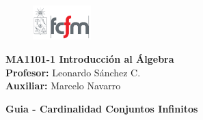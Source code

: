 \documentclass[letterpaper,12pt]{article}
\theoremstyle{plain}
\begin{document}
\newpage
\pagestyle{fancy}
\fancyhf{}
\fancyfoot[C]{\thepage} 

\begin{figure} %
    \vspace{-5mm}
    \includegraphics[width=0.2\textwidth]{img/fcfm2.png}
\end{figure}


\noindent
\textbf{MA1101-1 Introducción al Álgebra}\\
\textbf{Profesor: }Leonardo Sánchez C.\\
\textbf{Auxiliar: }Marcelo Navarro \\

\begin{center}
{\bf \Large Guia - Cardinalidad Conjuntos Infinitos}\\
\end{center}
\end{document}

